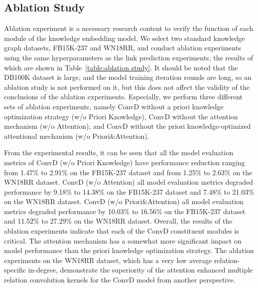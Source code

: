 \documentclass[letterpaper]{article} %
\begin{document}
\subsection{Ablation Study}
Ablation experiment is a necessary research content to verify the function of each module of the knowledge embedding model. We select two standard knowledge graph datasets, FB15K-237 and WN18RR, and conduct ablation experiments using the same hyperparameters as the link prediction experiments, the results of which are shown in Table~\ref{table:ablation study}. It should be noted that the DB100K dataset is large, and the model training iteration rounds are long, so an ablation study is not performed on it, but this does not affect the validity of the conclusions of the ablation experiments. Especially, we perform three different sets of ablation experiments, namely ConvD without a priori knowledge optimization strategy (w/o Priori Knowledge), ConvD without the attention mechanism (w/o Attention), and ConvD without the priori knowledge-optimized attentional mechanism (w/o Priori\&Attention).

From the experimental results, it can be seen that all the model evaluation metrics of ConvD (w/o Priori Knowledge) have performance reduction ranging from 1.47\% to 2.91\% on the FB15K-237 dataset and from 1.25\% to 2.63\% on the WN18RR dataset. ConvD (w/o Attention) all model evaluation metrics degraded performance by 9.18\% to 14.38\% on the FB15K-237 dataset and 7.48\% to 21.03\% on the WN18RR dataset. ConvD (w/o Priori\&Attention) all model evaluation metrics degraded performance by 10.03\% to 16.56\% on the FB15K-237 dataset and 11.52\% to 27.29\% on the WN18RR dataset. Overall, the results of the ablation experiments indicate that each of the ConvD constituent modules is critical. The attention mechanism has a somewhat more significant impact on model performance than the priori knowledge optimization strategy. The ablation experiments on the WN18RR dataset, which has a very low average relation-specific in-degree, demonstrate the superiority of the attention enhanced multiple relation convolution kernels for the ConvD model from another perspective.
\end{document}
